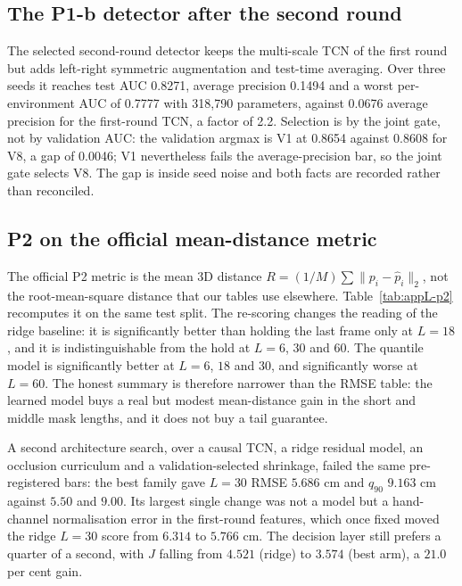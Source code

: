 \subsection*{The P1-b detector after the second round}
The selected second-round detector keeps the multi-scale TCN of the first round but
adds left-right symmetric augmentation and test-time averaging. Over three seeds it
reaches test AUC 0.8271, average precision 0.1494 and a
worst per-environment AUC of 0.7777 with 318,790 parameters,
against 0.0676 average precision for the first-round TCN, a factor of
2.2. Selection is by the joint gate, not by validation AUC:
the validation argmax is V1 at 0.8654 against
0.8608 for V8, a gap of 0.0046; V1 nevertheless
fails the average-precision bar, so the joint gate selects V8. The gap is inside seed
noise and both facts are recorded rather than reconciled.

\subsection*{P2 on the official mean-distance metric}
The official P2 metric is the mean 3D distance $R=(1/M)\sum\|p_i-\hat p_i\|_2$, not
the root-mean-square distance that our tables use elsewhere. Table~\ref{tab:appL-p2}
recomputes it on the same test split. The re-scoring changes the reading of the
ridge baseline: it is significantly better than holding the last frame only at
$L=18$, and it is indistinguishable from the hold at $L=6$, $30$ and $60$. The
quantile model is significantly better at $L=6$, $18$ and $30$, and significantly
worse at $L=60$. The honest summary is therefore narrower than the RMSE table:
the learned model buys a real but modest mean-distance gain in the short and middle
mask lengths, and it does not buy a tail guarantee.

A second architecture search, over a causal TCN, a ridge residual model, an occlusion
curriculum and a validation-selected shrinkage, failed the same pre-registered bars:
the best family gave $L=30$ RMSE $5.686$ cm and $q_{90}$ $9.163$ cm against $5.50$
and $9.00$. Its largest single change was not a model but a hand-channel normalisation
error in the first-round features, which once fixed moved the ridge $L=30$ score from
$6.314$ to $5.766$ cm. The decision layer still prefers a quarter of a second, with
$J$ falling from $4.521$ (ridge) to $3.574$ (best arm), a $21.0$ per cent gain.

